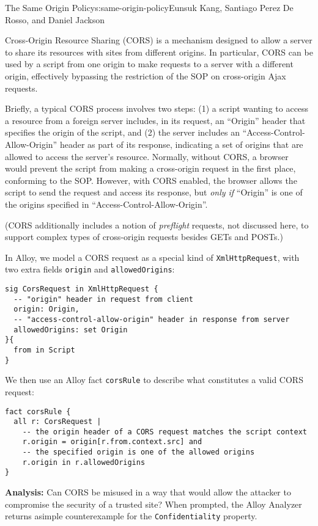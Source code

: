 \begin{aosachapter}{The Same Origin Policy}{s:same-origin-policy}{Eunsuk Kang, Santiago Perez De Rosso, and Daniel Jackson}
\label{cross-origin-resource-sharing-cors}

Cross-Origin Resource Sharing (CORS) is a mechanism designed to allow a
server to share its resources with sites from different origins. In
particular, CORS can be used by a script from one origin to make
requests to a server with a different origin, effectively bypassing the
restriction of the SOP on cross-origin Ajax requests.

Briefly, a typical CORS process involves two steps: (1) a script wanting
to access a resource from a foreign server includes, in its request, an
``Origin'' header that specifies the origin of the script, and (2) the
server includes an ``Access-Control-Allow-Origin'' header as part of its
response, indicating a set of origins that are allowed to access the
server's resource. Normally, without CORS, a browser would prevent the
script from making a cross-origin request in the first place, conforming
to the SOP. However, with CORS enabled, the browser allows the script to
send the request and access its response, but \emph{only if} ``Origin''
is one of the origins specified in ``Access-Control-Allow-Origin''.

(CORS additionally includes a notion of \emph{preflight} requests, not
discussed here, to support complex types of cross-origin requests
besides GETs and POSTs.)

In Alloy, we model a CORS request as a special kind of
\texttt{XmlHttpRequest}, with two extra fields \texttt{origin} and
\texttt{allowedOrigins}:

\begin{verbatim}
sig CorsRequest in XmlHttpRequest {
  -- "origin" header in request from client
  origin: Origin,
  -- "access-control-allow-origin" header in response from server
  allowedOrigins: set Origin
}{
  from in Script
}
\end{verbatim}

We then use an Alloy fact \texttt{corsRule} to describe what constitutes
a valid CORS request:

\begin{verbatim}
fact corsRule {
  all r: CorsRequest |
    -- the origin header of a CORS request matches the script context
    r.origin = origin[r.from.context.src] and
    -- the specified origin is one of the allowed origins
    r.origin in r.allowedOrigins
}
\end{verbatim}

\textbf{Analysis:} Can CORS be misused in a way that would allow the
attacker to compromise the security of a trusted site? When prompted,
the Alloy Analyzer returns asimple counterexample for the
\texttt{Confidentiality} property.


\end{aosachapter}
